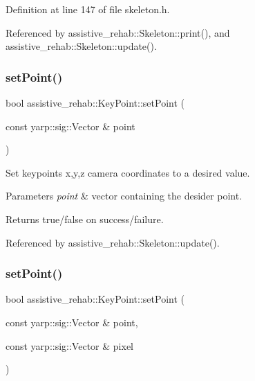 Definition at line 147 of file skeleton.\+h.


\begin{DoxyCode}{0}

\end{DoxyCode}


Referenced by assistive\+\_\+rehab\+::\+Skeleton\+::print(), and assistive\+\_\+rehab\+::\+Skeleton\+::update().

\mbox{\label{classassistive__rehab_1_1KeyPoint_a6430d1d6b7704a85462de39b6962e48b}} 
\subsubsection{\texorpdfstring{setPoint()}{setPoint()}\hspace{0.1cm}{\footnotesize\ttfamily [1/2]}}
{\footnotesize\ttfamily bool assistive\+\_\+rehab\+::\+Key\+Point\+::set\+Point (\begin{DoxyParamCaption}\item[{const yarp\+::sig\+::\+Vector \&}]{point }\end{DoxyParamCaption})}



Set keypoint\textquotesingle{}s x,y,z camera coordinates to a desired value. 


\begin{DoxyParams}{Parameters}
{\em point} & vector containing the desider point. \\
\hline
\end{DoxyParams}
\begin{DoxyReturn}{Returns}
true/false on success/failure. 
\end{DoxyReturn}


Referenced by assistive\+\_\+rehab\+::\+Skeleton\+::update().

\mbox{\label{classassistive__rehab_1_1KeyPoint_adcb8950f2c32cdf93c3d4b2f6a9f1a70}} 
\subsubsection{\texorpdfstring{setPoint()}{setPoint()}\hspace{0.1cm}{\footnotesize\ttfamily [2/2]}}
{\footnotesize\ttfamily bool assistive\+\_\+rehab\+::\+Key\+Point\+::set\+Point (\begin{DoxyParamCaption}\item[{const yarp\+::sig\+::\+Vector \&}]{point,  }\item[{const yarp\+::sig\+::\+Vector \&}]{pixel }\end{DoxyParamCaption})}



